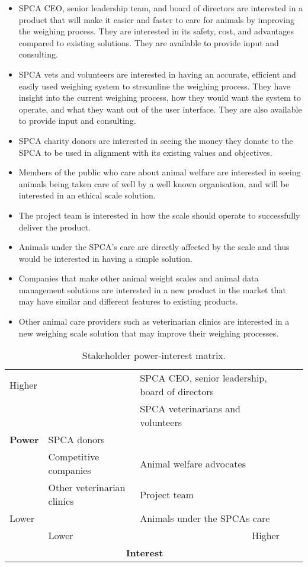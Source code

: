 \begin{itemize}
	\item 
	SPCA CEO, senior leadership team, and board of directors are interested in a product that will make it easier and faster to care for animals by improving the weighing process. They are interested in its safety, cost, and advantages compared to existing solutions. They are available to provide input and consulting.
	\item 
	SPCA vets and volunteers are interested in having an accurate, efficient and easily used weighing system to streamline the weighing process. They have insight into the current weighing process, how they would want the system to operate, and what they want out of the user interface. They are also available to provide input and consulting.
	\item 
	SPCA charity donors are interested in seeing the money they donate to the SPCA to be used in alignment with its existing values and objectives.
	\item 
	Members of the public who care about animal welfare are interested in seeing animals being taken care of well by a well known organisation, and will be interested in an ethical scale solution.
	\item 
	The project team is interested in how the scale should operate to successfully deliver the product. 
	\item 
	Animals under the SPCA’s care are directly affected by the scale and thus would be interested in having a simple solution.
	\item 
	Companies that make other animal weight scales and animal data management solutions are interested in a new product in the market that may have similar and different features to existing products.
	\item 
	Other animal care providers such as veterinarian clinics are interested in a new weighing scale solution that may improve their weighing processes.
\end{itemize}

\begin{table}[!ht]
	\centering
	\caption{Stakeholder power-interest matrix.}
	
	\begin{tabular}{l|llll}
		\hline
		 Higher& & SPCA CEO, senior leadership, board of directors\\
		&&  SPCA veterinarians and volunteers\\
	\textbf{Power}	& SPCA donors & &\\
	& Competitive companies & Animal welfare advocates\\
		& Other veterinarian clinics & Project team\\
		Lower& & Animals under the SPCAs care
		\\
		\hline
		&Lower & \multicolumn{1}{r}{Higher}\\
		\multicolumn{3}{c}{\textbf{Interest}}
	\end{tabular}
	\label{tab:stakeholders}
\end{table}

